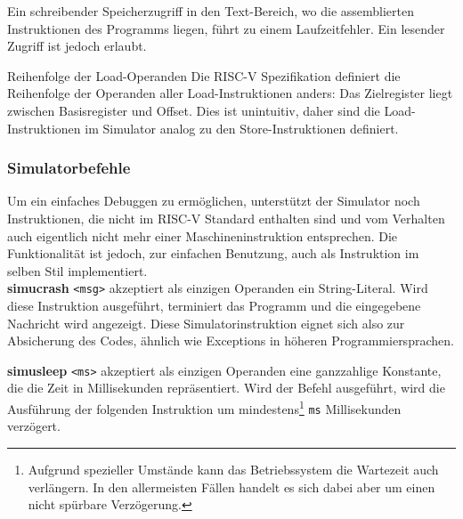 \begin{warningblock}
	Ein schreibender Speicherzugriff in den Text-Bereich, wo die assemblierten Instruktionen des Programms liegen, führt zu einem Laufzeitfehler. Ein lesender Zugriff ist jedoch erlaubt.
\end{warningblock}

\begin{infoblock}{Reihenfolge der Load-Operanden}
	Die RISC-V Spezifikation definiert die Reihenfolge der Operanden aller Load-Instruktionen anders: Das Zielregister liegt zwischen Basisregister und Offset. Dies ist unintuitiv, daher sind die Load-Instruktionen im Simulator analog zu den Store-Instruktionen definiert.
\end{infoblock}

\subsubsection{Simulatorbefehle}
Um ein einfaches Debuggen zu ermöglichen, unterstützt der Simulator noch Instruktionen, die nicht im RISC-V Standard enthalten sind und vom Verhalten auch eigentlich nicht mehr einer Maschineninstruktion entsprechen. Die Funktionalität ist jedoch, zur einfachen Benutzung, auch als Instruktion im selben Stil implementiert.\\

\textbf{simucrash }\texttt{<msg>} akzeptiert als einzigen Operanden ein String-Literal. Wird diese Instruktion ausgeführt, terminiert das Programm und die eingegebene Nachricht wird angezeigt. Diese Simulatorinstruktion eignet sich also zur Absicherung des Codes, ähnlich wie Exceptions in höheren Programmiersprachen.\\

\textbf{simusleep }\texttt{<ms>} akzeptiert als einzigen Operanden eine ganzzahlige Konstante, die die Zeit in Millisekunden repräsentiert. Wird der Befehl ausgeführt, wird die Ausführung der folgenden Instruktion um mindestens\footnote{Aufgrund spezieller Umstände kann das Betriebssystem die Wartezeit auch verlängern. In den allermeisten Fällen handelt es sich dabei aber um einen nicht spürbare Verzögerung.} \texttt{ms} Millisekunden verzögert.


